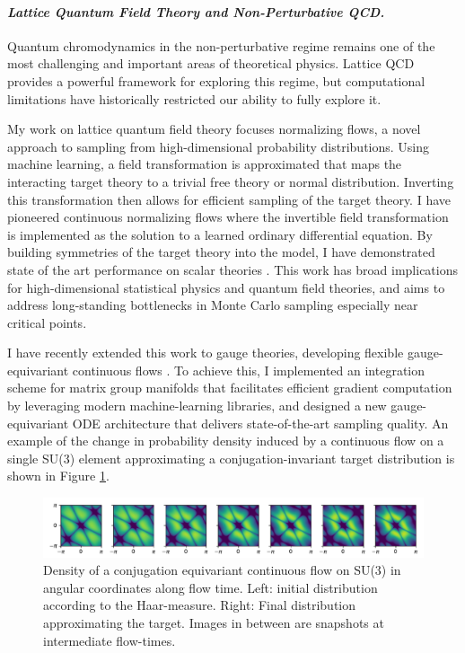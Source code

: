 \documentclass[12pt]{article}
\begin{document}
\paragraph{\textit{{Lattice Quantum Field Theory and Non-Perturbative QCD.}}}
Quantum chromodynamics in the non-perturbative regime remains one of the most challenging and important areas of theoretical physics.
Lattice QCD provides a powerful framework for exploring this regime, but computational limitations have historically restricted our ability to fully explore it.

My work on lattice quantum field theory focuses normalizing flows, a novel approach to sampling from high-dimensional probability distributions.
Using machine learning, a field transformation is approximated that maps the interacting target theory to a trivial free theory or normal distribution.
Inverting this transformation then allows for efficient sampling of the target theory.
I have pioneered continuous normalizing flows where the invertible field transformation is implemented as the solution to a learned ordinary differential equation. By building symmetries of the target theory into the model, I have demonstrated state of the art performance on scalar theories \cite{gerdes2023LearningLattice}. This work has broad implications for high-dimensional statistical physics and quantum field theories, and aims to address long-standing bottlenecks in Monte Carlo sampling especially near critical points.

I have recently extended this work to gauge theories, developing flexible gauge-equivariant continuous flows \cite{gerdes2024continuousGauge}.
To achieve this, I implemented an integration scheme for matrix group manifolds that facilitates efficient gradient computation by leveraging modern machine-learning libraries, and designed a new gauge-equivariant ODE architecture that delivers state-of-the-art sampling quality.
An example of the change in probability density induced by a continuous flow on a single SU(3) element approximating a conjugation-invariant target distribution is shown in Figure \ref{fig:su3}.

\begin{figure}
    \centering
    \includegraphics[width=\linewidth]{su3.pdf}
    \vspace{-25pt}
    \caption{ Density of a conjugation equivariant continuous flow on SU(3) in angular coordinates along flow time. Left: initial distribution according to the Haar-measure. Right: Final distribution approximating the target. Images in between are snapshots at intermediate flow-times.}
    \label{fig:su3}
    \vspace{-10pt}
\end{figure}
\end{document}
